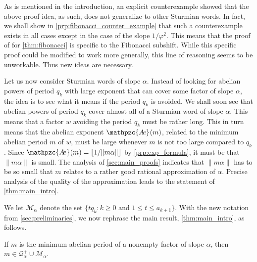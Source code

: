 \documentclass[a4paper,fleqn]{article}
\providecommand{\norm}[1]{\lVert#1\rVert}
\providecommand{\floor}[1]{\lfloor#1\rfloor}
\newcommand{\abexp}[2][]{\mathpzc{A\mkern-3mu e}_{#1}(#2)}
\newcommand{\qkl}[1]{\mathcal{Q}^+_{#1}}
\begin{document}
  As is mentioned in the introduction, an explicit counterexample showed that the above proof idea, as such, does not
  generalize to other Sturmian words. In fact, we shall show in \autoref{prp:fibonacci_counter_example} that such a
  counterexample exists in all cases except in the case of the slope $1/\varphi^2$. This means that the proof of
  \cite{2016:abelian_powers_and_repetitions_in_sturmian_words} for \autoref{thm:fibonacci} is specific to the Fibonacci
  subshift. While this specific proof could be modified to work more generally, this line of reasoning seems to be
  unworkable. Thus new ideas are necessary.

  Let us now consider Sturmian words of slope $\alpha$. Instead of looking for abelian powers of period $q_k$ with
  large exponent that can cover some factor of slope $\alpha$, the idea is to see what it means if the period $q_k$ is
  avoided. We shall soon see that abelian powers of period $q_k$ cover almost all of a Sturmian word of slope $\alpha$.
  This means that a factor $w$ avoiding the period $q_k$ must be rather long. This in turn means that the abelian
  exponent $\abexp{m}$, related to the minimum abelian period $m$ of $w$, must be large whenever $m$ is not too large
  compared to $q_k$. Since $\abexp{m} = \floor{1/\norm{m\alpha}}$ by \autoref{prp:exp_formula}, it must be that
  $\norm{m\alpha}$ is small. The analysis of \autoref{sec:main_proofs} indicates that $\norm{m\alpha}$ has to be so
  small that $m$ relates to a rather good rational approximation of $\alpha$. Precise analysis of the quality of the
  approximation leads to the statement of \autoref{thm:main_intro}.

  We let $\mathcal{M}_\alpha$ denote the set $\{tq_k : \text{$k \geq 0$ and $1 \leq t \leq a_{k+1}$}\}$. With the new
  notation from \autoref{sec:preliminaries}, we now rephrase the main result, \autoref{thm:main_intro}, as follows.
  
  \begin{theorem}\label{thm:main}
    If $m$ is the minimum abelian period of a nonempty factor of slope $\alpha$, then
    $m \in \qkl{\alpha} \cup \mathcal{M}_\alpha$.
  \end{theorem}
\end{document}
